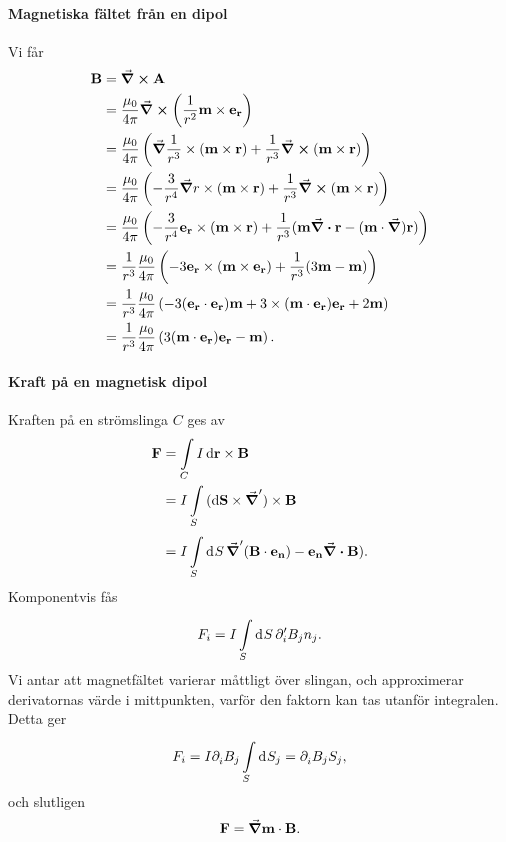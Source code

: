 \paragraph{Magnetiska fältet från en dipol}
Vi får
\begin{align*}
	\vb{B} &= \curl{\vb{A}} \\
	       &= \frac{\mu_{0}}{4\pi}\curl(\frac{1}{r^{2}}\vb{m}\times\vb{e}_{\vb{r}}) \\
	       &= \frac{\mu_{0}}{4\pi}\left(\grad{\frac{1}{r^{3}}}\times(\vb{m}\times\vb{r}) + \frac{1}{r^{3}}\curl(\vb{m}\times\vb{r})\right) \\
	       &= \frac{\mu_{0}}{4\pi}\left(-\frac{3}{r^{4}}\grad{r}\times(\vb{m}\times\vb{r}) + \frac{1}{r^{3}}\curl(\vb{m}\times\vb{r})\right) \\
	       &= \frac{\mu_{0}}{4\pi}\left(-\frac{3}{r^{4}}\vb{e}_{\vb{r}}\times(\vb{m}\times\vb{r}) + \frac{1}{r^{3}}(\vb{m}\div{\vb{r}}  - (\vb{m}\cdot\grad)\vb{r})\right) \\
	       &= \frac{1}{r^{3}}\frac{\mu_{0}}{4\pi}\left(-3\vb{e}_{\vb{r}}\times(\vb{m}\times\vb{e}_{\vb{r}}) + \frac{1}{r^{3}}(3\vb{m}  - \vb{m})\right) \\
	       &= \frac{1}{r^{3}}\frac{\mu_{0}}{4\pi}\left(-3(\vb{e}_{\vb{r}}\cdot\vb{e}_{\vb{r}})\vb{m} + 3\times(\vb{m}\cdot\vb{e}_{\vb{r}})\vb{e}_{\vb{r}} + 2\vb{m}\right) \\
	       &= \frac{1}{r^{3}}\frac{\mu_{0}}{4\pi}\left(3(\vb{m}\cdot\vb{e}_{\vb{r}})\vb{e}_{\vb{r}} - \vb{m}\right).
\end{align*}

\paragraph{Kraft på en magnetisk dipol}
Kraften på en strömslinga $C$ ges av
\begin{align*}
	\vb{F} &= \int\limits_{C}{I\dd{\vb{r}}\times\vb{B}} \\
	       &= I\int\limits_{S}{(\dd{\vb{S}}\times\grad')\times\vb{B}} \\
	       &= I\int\limits_{S}^{}\dd[]{S}\grad'(\vb{B}\cdot\vb{e}_{\vb{n}}) - \vb{e}_{\vb{n}}\div{\vb{B}}).
\end{align*}
Komponentvis fås
\begin{align*}
	F_{i} = I\int\limits_{S}^{}\dd[]{S}\partial_{i}'B_{j}n_{j}.
\end{align*}
Vi antar att magnetfältet varierar måttligt över slingan, och approximerar derivatornas värde i mittpunkten, varför den faktorn kan tas utanför integralen. Detta ger
\begin{align*}
	F_{i} = I\partial_{i}^{}B_{j}\int\limits_{S}^{}\dd[]{S_{j}} = \partial_{i}^{}B_{j}S_{j},
\end{align*}
och slutligen
\begin{align*}
	\vb{F} = \grad{\vb{m}\cdot\vb{B}}.
\end{align*}

